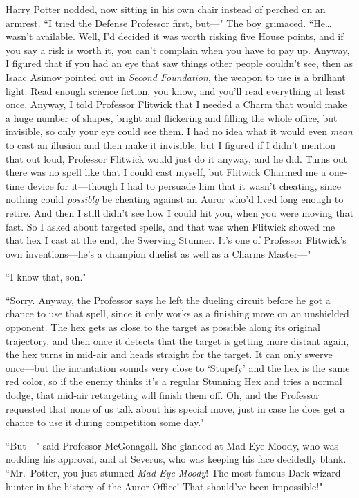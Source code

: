 Harry Potter nodded, now sitting in his own chair instead of perched on an armrest. ``I tried the Defense Professor first, but—" The boy grimaced. ``He{\ldots} wasn't available. Well, I'd decided it was worth risking five House points, and if you say a risk is worth it, you can't complain when you have to pay up. Anyway, I figured that if you had an eye that saw things other people couldn't see, then as Isaac Asimov pointed out in \emph{Second Foundation}, the weapon to use is a brilliant light. Read enough science fiction, you know, and you'll read everything at least once. Anyway, I told Professor Flitwick that I needed a Charm that would make a huge number of shapes, bright and flickering and filling the whole office, but invisible, so only your eye could see them. I had no idea what it would even \emph{mean} to cast an illusion and then make it invisible, but I figured if I didn't mention that out loud, Professor Flitwick would just do it anyway, and he did. Turns out there was no spell like that I could cast myself, but Flitwick Charmed me a one-time device for it—though I had to persuade him that it wasn't cheating, since nothing could \emph{possibly} be cheating against an Auror who'd lived long enough to retire. And then I still didn't see how I could hit you, when you were moving that fast. So I asked about targeted spells, and that was when Flitwick showed me that hex I cast at the end, the Swerving Stunner. It's one of Professor Flitwick's own inventions—he's a champion duelist as well as a Charms Master—"

``I know that, son."

``Sorry. Anyway, the Professor says he left the dueling circuit before he got a chance to use that spell, since it only works as a finishing move on an unshielded opponent. The hex gets as close to the target as possible along its original trajectory, and then once it detects that the target is getting more distant again, the hex turns in mid-air and heads straight for the target. It can only swerve once—but the incantation sounds very close to `Stupefy' and the hex is the same red color, so if the enemy thinks it's a regular Stunning Hex and tries a normal dodge, that mid-air retargeting will finish them off. Oh, and the Professor requested that none of us talk about his special move, just in case he does get a chance to use it during competition some day."

``But—" said Professor McGonagall. She glanced at Mad-Eye Moody, who was nodding his approval, and at Severus, who was keeping his face decidedly blank. ``Mr.~Potter, you just stunned \emph{Mad-Eye Moody}! The most famous Dark wizard hunter in the history of the Auror Office! That should've been impossible!"

